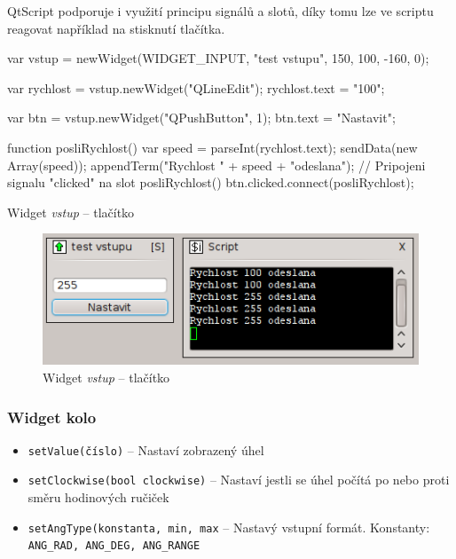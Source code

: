 \documentclass[12pt, a4paper, oneside]{article}
\newcommand{\It}{\textit}  %
\begin{document}
\newpage
QtScript podporuje i využití principu signálů a slotů, díky tomu lze ve scriptu reagovat například na stisknutí tlačítka.

\begin{listing}[H]
\begin{jscode}
var vstup = newWidget(WIDGET_INPUT,
                "test vstupu", 150, 100, -160, 0);

var rychlost = vstup.newWidget("QLineEdit");
rychlost.text = "100";

var btn = vstup.newWidget("QPushButton", 1);
btn.text = "Nastavit";

function posliRychlost() {
    var speed = parseInt(rychlost.text);
    sendData(new Array(speed));
    appendTerm("Rychlost " + speed + "odeslana\n");
}
// Pripojeni signalu "clicked" na slot posliRychlost()
btn.clicked.connect(posliRychlost);
\end{jscode}
\caption{Widget \It{vstup} -- tlačítko}
\end{listing}

\begin{figure}[H]
\begin{center}
\includegraphics{img/ref_input2.png}
\caption{Widget \It{vstup} -- tlačítko}
\end{center}
\end{figure}

\subsubsection*{Widget kolo}
\begin{itemize}
    \item {\color{blue}\verb/setValue(číslo)/} -- Nastaví zobrazený úhel
    \item {\color{blue}\verb/setClockwise(bool clockwise)/} -- Nastaví jestli se úhel počítá po nebo proti směru hodinových ručiček
    \item {\color{blue}\verb/setAngType(konstanta, min, max/} -- Nastavý vstupní formát. Konstanty:
\verb|ANG_RAD, ANG_DEG, ANG_RANGE|
\end{itemize}
\end{document}
